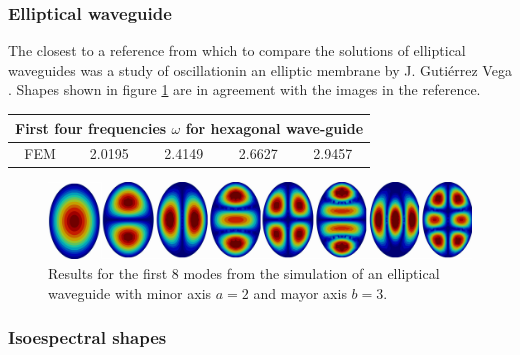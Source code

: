 \subsubsection{Elliptical waveguide}

The closest to a reference from which to compare the solutions of elliptical waveguides was a study of oscillationin an elliptic membrane by J. Gutiérrez Vega \cite{J.Gutierrez-Vega1999}. Shapes shown in figure \ref{fig:elliptical_waveguide} are in agreement with the images in the reference. 

\begin{center}
\begin{tabular}{|c|c|c|c|c|}
\hline
\multicolumn{5}{|c|}{First four frequencies $\omega$ for hexagonal wave-guide} \\
\hline 
FEM     & 2.0195 & 2.4149 & 2.6627 & 2.9457 \\ 
\hline 
\end{tabular} 
\label{tab:eli_wav_comparison}
\end{center}
\begin{figure}
\centering
\includegraphics[scale=0.1]{./img/elliptical_waveguide.pdf}
\caption{Results for the first 8 modes from the simulation of an elliptical waveguide with minor axis $a=2$ and mayor axis $b=3$.}
\label{fig:elliptical_waveguide}
\end{figure}
\subsubsection{Isoespectral shapes}


